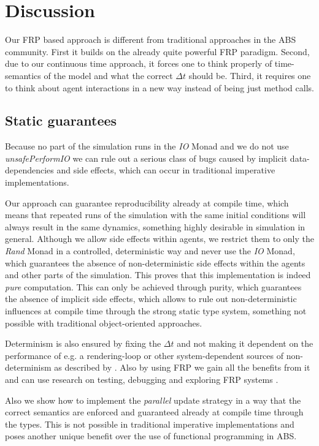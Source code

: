 \section{Discussion}
Our FRP based approach is different from traditional approaches in the ABS community. First it builds on the already quite powerful FRP paradigm. Second, due to our continuous time approach, it forces one to think properly of time-semantics of the model and what the correct $\Delta t$ should be. Third, it requires one to think about agent interactions in a new way instead of being just method calls.

\subsection{Static guarantees}
Because no part of the simulation runs in the \textit{IO} Monad and we do not use \textit{unsafePerformIO} we can rule out a serious class of bugs caused by implicit data-dependencies and side effects, which can occur in traditional imperative implementations.

Our approach can guarantee reproducibility already at compile time, which means that repeated runs of the simulation with the same initial conditions will always result in the same dynamics, something highly desirable in simulation in general. Although we allow side effects within agents, we restrict them to only the \textit{Rand} Monad in a controlled, deterministic way and never use the \textit{IO} Monad, which guarantees the absence of non-deterministic side effects within the agents and other parts of the simulation. This proves that this implementation is indeed \textit{pure} computation. This can only be achieved through purity, which guarantees the absence of implicit side effects, which allows to rule out non-deterministic influences at compile time through the strong static type system, something not possible with traditional object-oriented approaches.

Determinism is also ensured by fixing the $\Delta t$ and not making it dependent on the performance of e.g. a rendering-loop or other system-dependent sources of non-determinism as described by \cite{perez_testing_2017}. Also by using FRP we gain all the benefits from it and can use research on testing, debugging and exploring FRP systems \cite{perez_back_2017,perez_testing_2017}.

Also we show how to implement the \textit{parallel} update strategy \cite{thaler_art_2017} in a way that the correct semantics are enforced and guaranteed already at compile time through the types. This is not possible in traditional imperative implementations and poses another unique benefit over the use of functional programming in ABS.

